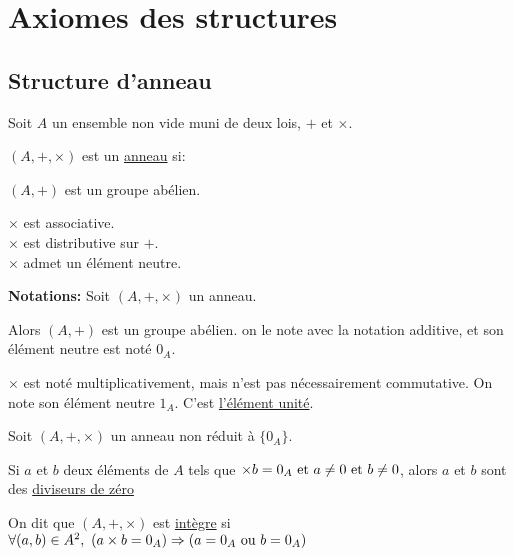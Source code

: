 \documentclass[12pt,twoside,a4paper]{article}
\author{MPSI 2}
\begin{document}
	\maketitle
	\section{Axiomes des structures}
		\subsection{Structure d'anneau}
			\begin{flushleft}
				Soit $A$ un ensemble non vide muni de deux lois, $+$ et $\times$.
			\end{flushleft}
			\begin{defi}
				$(A,+,\times)$ est un \underline{anneau} si:
				\begin{liste}
					\item[\cercle1]$(A,+)$ est un groupe abélien.
					\item[\cercle2]$\times$ est associative.\\
						$\times$ est distributive sur $+$.\\
						$\times$ admet un élément neutre.
				\end{liste}
			\end{defi}
			\begin{flushleft}
				\textbf{Notations:} Soit $(A,+,\times)$ un anneau.
				\begin{liste}
					\item Alors $(A,+)$ est un groupe abélien. on le note avec la notation additive, et son élément neutre est noté $0_A$.
					\item $\times$ est noté multiplicativement, mais n'est pas nécessairement commutative. On note son élément neutre $1_A$. C'est \underline{l'élément unité}.
				\end{liste}
			\end{flushleft}
			\begin{defi}
				Soit $(A,+,\times)$ un anneau non réduit \`a $\{0_A\}$.
				\begin{liste}
					\item Si $a$ et $b$ deux éléments de $A$ tels que $\times b=0_A\text{ et } a\neq0\text{ et } b\neq0$, alors $a$ et $b$ sont des \underline{diviseurs de zéro}
					\item On dit que $(A,+,\times)$ est \underline{intègre} si $\forall (a,b)\in A^{2},\ (a\times b=0_A)\Rightarrow (a=0_A\text{ ou } b=0_A)$
				\end{liste}
			\end{defi}
\end{document}
